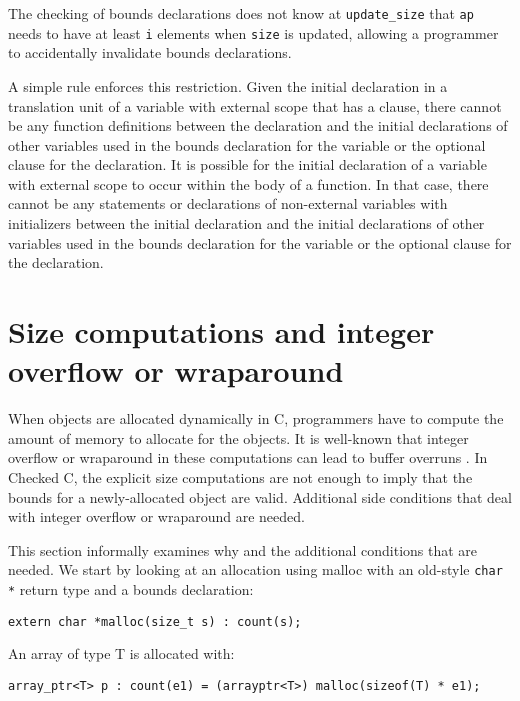 The checking of bounds declarations does not know at
\texttt{update\_size} that \texttt{ap} needs to have at least \texttt{i}
elements when \texttt{size} is updated, allowing a programmer to accidentally
invalidate bounds declarations.

A simple rule enforces this restriction. Given the initial declaration
in a translation unit of a variable with external scope that has a
 clause, there cannot be any function definitions between
the declaration and the initial declarations of other variables used in
the bounds declaration for the variable or the optional  clause for the declaration.
It is possible for the initial declaration of
a variable with external scope to occur within the body of a function.
In that case, there cannot be any statements or declarations of
non-external variables with initializers between the initial declaration
and the initial declarations of other variables used in the
bounds declaration for the variable or the optional  clause for
the declaration.

\section{Size computations and integer overflow or wraparound}
\label{section:integer-overflow-informal}

When objects are allocated dynamically in C, programmers have to compute
the amount of memory to allocate for the objects. It is well-known 
that integer overflow or wraparound in these computations can lead to buffer
overruns \cite{Howard2003,Mitre2015-128,Mitre2015-190,Mitre2015-680,Dietz2015}.
 In Checked C, the explicit size computations are not enough
to imply that the bounds for a newly-allocated object are valid.
Additional side conditions that deal with integer overflow or wraparound
are needed.

This section informally examines why and the additional conditions that
are needed. We start by looking at an allocation using malloc with an
old-style \texttt{char *} return type and a bounds declaration:

\begin{verbatim}
extern char *malloc(size_t s) : count(s);
\end{verbatim}

An array of type T is allocated with:

\begin{verbatim}
array_ptr<T> p : count(e1) = (arrayptr<T>) malloc(sizeof(T) * e1);
\end{verbatim}


